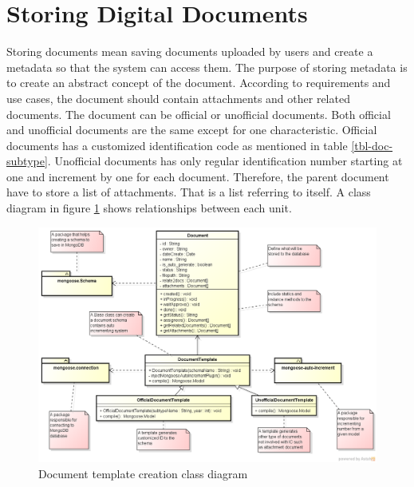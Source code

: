 \section{Storing Digital Documents}
Storing documents mean saving documents uploaded by users and create a metadata so that the system can access them.
The purpose of storing metadata is to create an abstract concept of the document.
According to requirements and use cases, the document should contain attachments and other related documents.
The document can be official or unofficial documents.
Both official and unofficial documents are the same except for one characteristic.
Official documents has a customized identification code as mentioned in table \ref{tbl-doc-subtype}.
Unofficial documents has only regular identification number starting at one and increment by one for each document.
Therefore, the parent document have to store a list of attachments.
That is a list referring to itself.
A class diagram in figure \ref{fig:doc-template} shows relationships between each unit.

\begin{figure}
	\caption{Document template creation class diagram}
	\label{fig:doc-template}
	\includegraphics[scale=0.5]{res/software-design/document_templating}
\end{figure}

